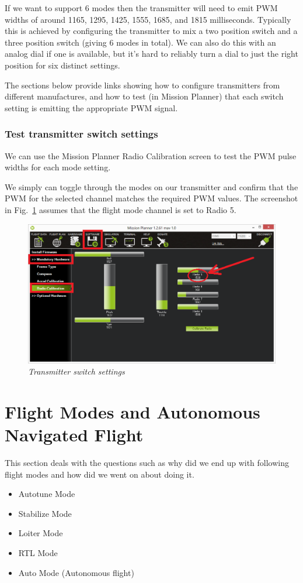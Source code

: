 If we want to support 6 modes then the transmitter will need to emit PWM widths of around 1165, 1295, 1425, 1555, 1685, and 1815 milliseconds. Typically this is achieved by configuring the transmitter to mix a two position switch and a three position switch (giving 6 modes in total). We can also do this with an analog dial if one is available, but it’s hard to reliably turn a dial to just the right position for six distinct settings.

The sections below provide links showing how to configure transmitters from different manufactures, and how to test (in Mission Planner) that each switch setting is emitting the appropriate PWM signal.

\subsubsection{Test transmitter switch settings}
We can use the Mission Planner Radio Calibration screen to test the PWM pulse widths for each mode setting.

We simply can toggle through the modes on our transmitter and confirm that the PWM for the selected channel matches the required PWM values. The screenshot in Fig.~\ref{fig: mos_8} assumes that the flight mode channel is set to Radio 5.



\begin{figure}[h]
	\includegraphics[width=1.0\linewidth]{mp_radio_calibration_ch5_pwm}
	\centering
	\caption{\label{fig: mos_8}\textit{Transmitter switch settings}}
\end{figure}


\section{Flight Modes and Autonomous Navigated Flight}
This section deals with the questions such as why did we end up with following flight modes and how did we went on about doing it.
\begin{itemize}
	\item Autotune Mode
	\item Stabilize Mode
	\item Loiter Mode
	\item RTL Mode
	\item Auto Mode (Autonomous flight)
\end{itemize}

